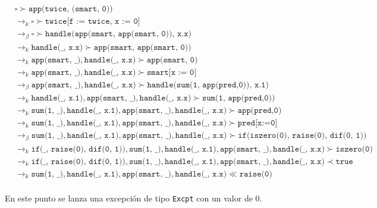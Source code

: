 \documentclass{article}
\newcommand{\tx}[1]{\texttt{#1}}
\newcommand{\ra}{\rightarrow}
\begin{document}
\begin{enumerate}
{\begin{itemize}
{			\begin{align*}
				&\square \succ \tx{app(twice, (smart, 0))} \\
				&\ra_k \square \succ \tx{twice[f := twice, x := 0]}\\
				&\ra_{\beta} \square \succ \tx{handle(app(smart, app(smart, 0)), x.x)}\\
				&\ra_k \tx{handle(\_, x.x)} \succ \tx{app(smart, app(smart, 0))} \\
				& \ra_k \tx{app(smart, \_)}, \tx{handle(\_, x.x)} \succ \tx{app(smart, 0)}\\
				&\ra_k \tx{app(smart, \_)}, \tx{handle(\_, x.x)} \succ \tx{smart[x := 0]} \\
				&\ra_{\beta} \tx{app(smart, \_)}, \tx{handle(\_, x.x)} \succ \tx{handle(sum(1, app(pred,0)), x.1)} \\
				&\ra_k \tx{handle(\_, x.1)}, \tx{app(smart, \_)}, \tx{handle(\_, x.x)} \succ \tx{sum(1, app(pred,0))} \\
				&\ra_k \tx{sum(1, \_)}, \tx{handle(\_, x.1)}, \tx{app(smart, \_)}, \tx{handle(\_, x.x)} \succ \tx{app(pred,0)} \\
				&\ra_k \tx{sum(1, \_)}, \tx{handle(\_, x.1)}, \tx{app(smart, \_)}, \tx{handle(\_, x.x)} \succ \tx{pred[x:=0]} \\
				&\ra_{\beta} \tx{sum(1, \_)}, \tx{handle(\_, x.1)}, \tx{app(smart, \_)}, \tx{handle(\_, x.x)} \succ \tx{if(iszero(0), raise(0), dif(0, 1))}\\
				&\ra_k \tx{if(\_, raise(0), dif(0, 1))}, \tx{sum(1, \_)}, \tx{handle(\_, x.1)}, \tx{app(smart, \_)}, \tx{handle(\_, x.x)} \succ \tx{iszero(0)} \\
				&\ra_k \tx{if(\_, raise(0), dif(0, 1))}, \tx{sum(1, \_)}, \tx{handle(\_, x.1)}, \tx{app(smart, \_)}, \tx{handle(\_, x.x)} \prec \tx{true} \\
				&\ra_k \tx{sum(1, \_)}, \tx{handle(\_, x.1)}, \tx{app(smart, \_)}, \tx{handle(\_, x.x)} \ll \tx{raise(0)} \\
			\end{align*}

			En este punto se lanza una excepción de tipo \tx{Excpt} con un valor
			de 0.

}
\end{itemize}}
\end{enumerate}
\end{document}
